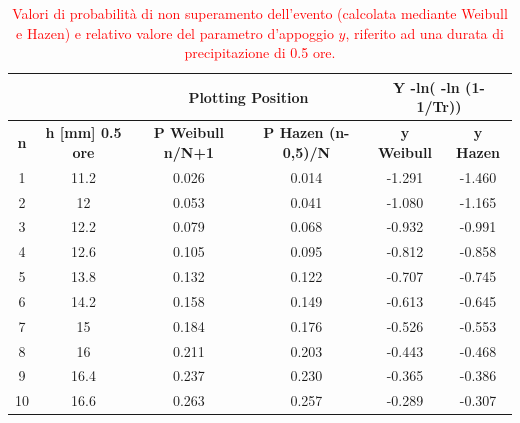 \begin{table}[H] \centering
    \caption{\textcolor{red}{Valori di probabilità di non superamento dell'evento (calcolata mediante Weibull e Hazen) e relativo valore del parametro d'appoggio $y$, riferito ad una durata di precipitazione di 0.5 ore.}}
    \begin{tabular}{cccccc}
 &  & \multicolumn{2}{c}{\textbf{Plotting Position}} & \multicolumn{2}{c}{\textbf{Y -ln( -ln (1- 1/Tr))}}\\
 \toprule
    \textbf{n} & \textbf{h [mm] 0.5 ore} & \textbf{P Weibull   n/N+1} & \textbf{P Hazen  (n-0,5)/N} & \textbf{y Weibull} & \textbf{y Hazen}\\
\midrule
    1          & 11.2                        & 0.026                      & 0.014                       & -1.291                  & -1.460                  \\
    2          & 12                          & 0.053                      & 0.041                       & -1.080                  & -1.165                  \\
    3          & 12.2                        & 0.079                      & 0.068                       & -0.932                  & -0.991                  \\
    4          & 12.6                        & 0.105                      & 0.095                       & -0.812                  & -0.858                  \\
    5          & 13.8                        & 0.132                      & 0.122                       & -0.707                  & -0.745                  \\
    6          & 14.2                        & 0.158                      & 0.149                       & -0.613                  & -0.645                  \\
    7          & 15                          & 0.184                      & 0.176                       & -0.526                  & -0.553                  \\
    8          & 16                          & 0.211                      & 0.203                       & -0.443                  & -0.468                  \\
    9          & 16.4                        & 0.237                      & 0.230                       & -0.365                  & -0.386                  \\
    10         & 16.6                        & 0.263                      & 0.257                       & -0.289                  & -0.307                  \\

\end{tabular}
\end{table}
